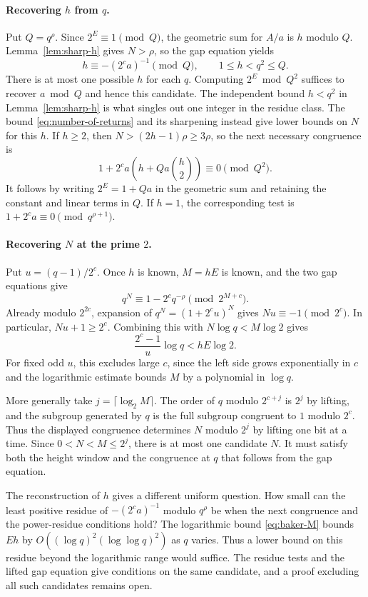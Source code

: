\documentclass[11pt]{article}
\begin{document}
\paragraph{Recovering $h$ from $q$.}
Put $Q=q^\rho$. Since $2^E\equiv1\pmod Q$, the geometric sum for
$A/a$ is $h$ modulo $Q$. Lemma~\ref{lem:sharp-h} gives $N>\rho$,
so the gap equation yields
\[
h\equiv-(2^ca)^{-1}\pmod Q,\qquad 1\le h<q^2\le Q.
\]
There is at most one possible $h$ for each $q$. Computing
$2^E\bmod Q^2$ suffices to recover $a\bmod Q$ and hence this
candidate. The independent bound $h<q^2$ in Lemma~\ref{lem:sharp-h}
is what singles out one integer in the residue class. The bound
\eqref{eq:number-of-returns} and its sharpening instead give
lower bounds on $N$ for this $h$. If $h\ge2$, then
$N>(2h-1)\rho\ge3\rho$, so the next
necessary congruence is
\[
1+2^ca\left(h+Q a\binom h2\right)\equiv0\pmod{Q^2}.
\]
It follows by writing $2^E=1+Qa$ in the geometric sum and retaining
the constant and linear terms in $Q$. If $h=1$, the corresponding
test is $1+2^ca\equiv0\pmod{q^{\rho+1}}$.

\paragraph{Recovering $N$ at the prime $2$.}
Put $u=(q-1)/2^c$. Once $h$ is known, $M=hE$ is known, and the
two gap equations give
\[
q^N\equiv 1-2^c q^{-\rho}\pmod{2^{M+c}}.
\]
Already modulo $2^{2c}$, expansion of $q^N=(1+2^cu)^N$ gives
$Nu\equiv-1\pmod{2^c}$. In particular, $Nu+1\ge2^c$.
Combining this with $N\log q<M\log2$ gives
\[
\frac{2^c-1}{u}\log q<hE\log2.
\]
For fixed odd $u$, this excludes large $c$, since the left
side grows exponentially in $c$ and the logarithmic estimate
bounds $M$ by a polynomial in $\log q$.

More generally take $j=\lceil\log_2 M\rceil$. The order of $q$
modulo $2^{c+j}$ is $2^j$ by lifting, and the subgroup generated
by $q$ is the full subgroup congruent to $1$ modulo $2^c$.
Thus the displayed congruence determines $N$ modulo $2^j$ by
lifting one bit at a time. Since $0<N<M\le2^j$, there is at most
one candidate $N$. It must satisfy both the height window and
the congruence at $q$ that follows from the gap equation.

The reconstruction of $h$ gives a different uniform question. How small
can the least positive residue of $-(2^ca)^{-1}$ modulo $q^\rho$
be when the next congruence and the power-residue conditions hold?
The logarithmic bound \eqref{eq:baker-M} bounds $Eh$ by
$O((\log q)^2(\log\log q)^2)$ as $q$ varies. Thus a lower bound
on this residue beyond the logarithmic range would suffice.
The residue tests and the lifted gap equation give conditions on
the same candidate, and a proof excluding all such candidates
remains open.
\end{document}
